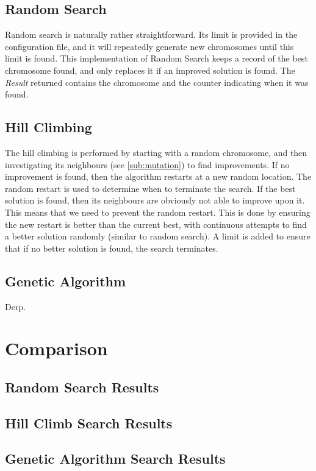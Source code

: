 \documentclass[11pt, a4paper]{article}
\begin{document}
\subsection{Random Search}
\label{sub:random_search}
Random search is naturally rather straightforward. Its limit is provided in the
configuration file, and it will repeatedly generate new chromosomes until this
limit is found. This implementation of Random Search keeps a record of the best
chromosome found, and only replaces it if an improved solution is found. The
\emph{Result} returned contains the chromosome and the counter indicating when
it was found.

\subsection{Hill Climbing}
\label{sub:hill_climbing}
The hill climbing is performed by starting with a random chromosome, and then
investigating its neighbours (see \ref{sub:mutation}) to find improvements. If
no improvement is found, then the algorithm restarts at a new random location.
The random restart is used to determine when to terminate the search. If the
best solution is found, then its neighbours are obviously not able to improve
upon it. This means that we need to prevent the random restart. This is done by
ensuring the new restart is better than the current best, with continuous
attempts to find a better solution randomly (similar to random search). A limit
is added to ensure that if no better solution is found, the search terminates.

\subsection{Genetic Algorithm}
\label{sub:genetic_algorithm}
Derp.

\newpage
\section{Comparison}
\subsection{Random Search Results}
\subsection{Hill Climb Search Results}
\subsection{Genetic Algorithm Search Results}


 
\end{document}
